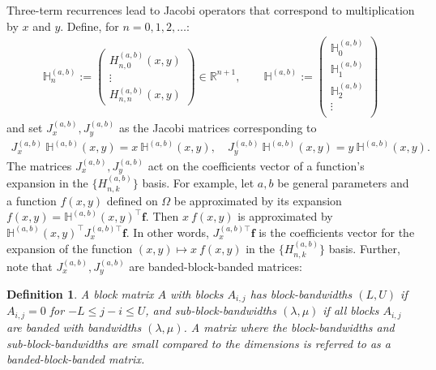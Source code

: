 \documentclass[11pt, oneside]{article}   	%
\newcommand{\R}{\mathbb{R}}
\newcommand{\hdop}{H}
\newcommand{\bighdop}{\mathbb{\hdop}}
\newcommand{\hdopab}{\hdop^{(a,b)}}
\newcommand{\hdopnkab}{\hdop_{n,k}^{(a,b)}}
\newcommand{\bighdopab}{\bighdop^{(a,b)}}
\newtheorem{definition}{Definition}
\begin{document}
Three-term recurrences lead to Jacobi operators that correspond to multiplication by $x$ and $y$. Define, for $n=0,1,2,\dots$: 
\begin{align*}
\bighdopab_n := \begin{pmatrix}
		\hdopab_{n,0}(x,y) \\
		\vdots \\
		\hdopab_{n,n}(x,y)
	\end{pmatrix} \in \R^{n+1}, 
\quad \quad 
\bighdopab := \begin{pmatrix}
		\bighdopab_0 \\
		\bighdopab_1 \\
		\bighdopab_2 \\
		\vdots \\
	\end{pmatrix}
\end{align*}
and set $J_x^{(a,b)}, J_y^{(a,b)}$ as the Jacobi matrices corresponding to
\begin{align}
J_x^{(a,b)} \: \bighdopab(x,y) = x \: \bighdopab(x,y), \quad J_y^{(a,b)} \: \bighdopab(x,y) = y \: \bighdopab(x,y).
\label{eqn:jacobimatricesdefinition}
\end{align}
The matrices $J_x^{(a,b)}, J_y^{(a,b)}$ act on the coefficients vector of a function's expansion in the $\{\hdopnkab\}$ basis. For example, let $a, b$ be general parameters and a function $f(x,y)$ defined on $\Omega$ be approximated by its expansion $f(x,y) = \bighdopab(x,y)^\top \mathbf{f}$. Then $x \: f(x,y)$ is approximated by $\bighdopab(x,y)^\top {J_x^{(a,b)\top}} \mathbf{f}$. In other words, ${J_x^{(a,b)\top}} \mathbf{f}$ is the coefficients vector for the expansion of the function $(x,y) \mapsto x \: f(x,y)$ in the  $\{\hdopnkab\}$ basis. Further, note that $J_x^{(a,b)}, J_y^{(a,b)}$ are banded-block-banded matrices:

\begin{definition}
A block matrix $A$ with blocks $A_{i,j}$ has block-bandwidths $(L,U)$ if $A_{i,j} = 0$ for $- L \leq j-i \leq U$, and sub-block-bandwidths $(\lambda, \mu)$ if all blocks $A_{i,j}$ are banded with bandwidths $(\lambda,\mu)$. A matrix where the block-bandwidths and sub-block-bandwidths are small compared to the dimensions is referred to as a banded-block-banded matrix. 
\end{definition}
\end{document}
